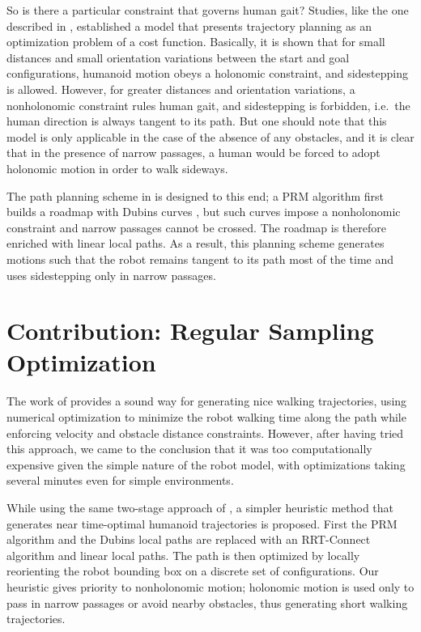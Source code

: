 So is there a particular constraint that governs human gait? Studies,
like the one described in \cite{momb10}, established a model that
presents trajectory planning as an optimization problem of a cost
function. Basically, it is shown that for small distances and small
orientation variations between the start and goal configurations,
humanoid motion obeys a holonomic constraint, and sidestepping is
allowed. However, for greater distances and orientation variations, a
nonholonomic constraint rules human gait, and sidestepping is
forbidden, i.e.\ the human direction is always tangent to its path.
But one should note that this model is only applicable in the case of
the absence of any obstacles, and it is clear that in the presence of
narrow passages, a human would be forced to adopt holonomic motion in
order to walk sideways.

The path planning scheme in \cite{yosh08} is designed to this end; a
PRM algorithm first builds a roadmap with Dubins curves \cite{dubi57},
but such curves impose a nonholonomic constraint and narrow passages
cannot be crossed. The roadmap is therefore enriched with linear local
paths. As a result, this planning scheme generates motions such that
the robot remains tangent to its path most of the time and uses
sidestepping only in narrow passages.

\section{Contribution: Regular Sampling Optimization}
\label{sec:chap1-contribution}

The work of \cite{moul10} provides a sound way for generating nice
walking trajectories, using numerical optimization to minimize the
robot walking time along the path while enforcing velocity and
obstacle distance constraints. However, after having tried this
approach, we came to the conclusion that it was too computationally
expensive given the simple nature of the robot model, with
optimizations taking several minutes even for simple environments.

While using the same two-stage approach of \cite{yosh08}, a simpler
heuristic method that generates near time-optimal humanoid
trajectories is proposed. First the PRM algorithm and the Dubins local
paths are replaced with an RRT-Connect algorithm and linear local
paths. The path is then optimized by locally reorienting the robot
bounding box on a discrete set of configurations. Our heuristic gives
priority to nonholonomic motion; holonomic motion is used only to pass
in narrow passages or avoid nearby obstacles, thus generating short
walking trajectories.

